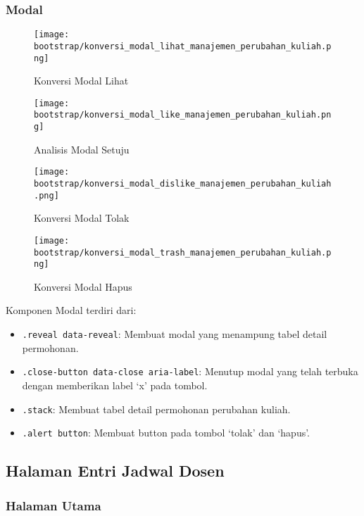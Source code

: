 \subsubsection{Modal}
\begin{figure} [H]
	\centering  
	\texttt{[image: bootstrap/konversi\_modal\_lihat\_manajemen\_perubahan\_kuliah.png]}
	\caption{Konversi Modal Lihat}
\end{figure}

\begin{figure} [H]
	\centering  
	\texttt{[image: bootstrap/konversi\_modal\_like\_manajemen\_perubahan\_kuliah.png]}
	\caption{Analisis Modal Setuju}
\end{figure}

\begin{figure} [H]
	\centering  
	\texttt{[image: bootstrap/konversi\_modal\_dislike\_manajemen\_perubahan\_kuliah.png]}
	\caption{Konversi Modal Tolak}
\end{figure}

\begin{figure} [H]
	\centering  
	\texttt{[image: bootstrap/konversi\_modal\_trash\_manajemen\_perubahan\_kuliah.png]}
	\caption{Konversi Modal Hapus}
\end{figure}
Komponen Modal terdiri dari:
\begin{itemize}
	\item \texttt{.reveal data-reveal}: Membuat modal yang menampung tabel detail permohonan.
	\item \texttt{.close-button data-close aria-label}: Menutup modal yang telah terbuka dengan memberikan label `x' pada tombol.
	\item \texttt{.stack}:	Membuat tabel detail permohonan perubahan kuliah.
	\item \texttt{.alert button}: Membuat button pada tombol `tolak'  dan `hapus'.
\end{itemize}



\subsection{Halaman Entri Jadwal Dosen}
\subsubsection{Halaman Utama}

